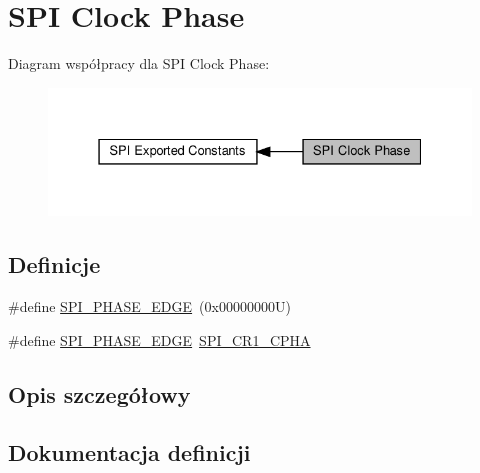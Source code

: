 \hypertarget{group___s_p_i___clock___phase}{}\section{S\+PI Clock Phase}
\label{group___s_p_i___clock___phase}
Diagram współpracy dla S\+PI Clock Phase\+:\nopagebreak
\begin{figure}[H]
\begin{center}
\leavevmode
\includegraphics[width=331pt]{group___s_p_i___clock___phase}
\end{center}
\end{figure}
\subsection*{Definicje}
\begin{DoxyCompactItemize}
\item 
\#define \hyperlink{group___s_p_i___clock___phase_ga208be78b79c51df200a495c4d2110b57}{S\+P\+I\+\_\+\+P\+H\+A\+S\+E\+\_\+E\+D\+GE}~(0x00000000\+U)
\item 
\#define \hyperlink{group___s_p_i___clock___phase_ga960275ac1d01d302c48e713399990c36}{S\+P\+I\+\_\+\+P\+H\+A\+S\+E\+\_\+E\+D\+GE}~\hyperlink{group___peripheral___registers___bits___definition_ga97602d8ded14bbd2c1deadaf308755a3}{S\+P\+I\+\_\+\+C\+R1\+\_\+\+C\+P\+HA}
\end{DoxyCompactItemize}


\subsection{Opis szczegółowy}


\subsection{Dokumentacja definicji}
\mbox{\label{group___s_p_i___clock___phase_ga208be78b79c51df200a495c4d2110b57}} 
